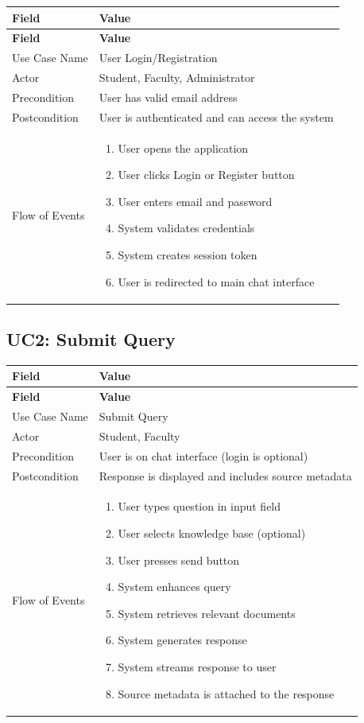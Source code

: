 \documentclass[12pt,a4paper]{book}
\numberwithin{table}{chapter}
\numberwithin{figure}{chapter}
\numberwithin{equation}{chapter}
\begin{document}
\begin{longtable}{|p{1.5in}|p{4in}|}
\hline
\textbf{Field} & \textbf{Value}\\
\hline
\endfirsthead
\hline
\textbf{Field} & \textbf{Value}\\
\hline
\endhead
\hline
Use Case Name & User Login/Registration\\
\hline
Actor & Student, Faculty, Administrator\\
\hline
Precondition & User has valid email address\\
\hline
Postcondition & User is authenticated and can access the system\\
\hline
Flow of Events &
\begin{enumerate}
    \item User opens the application
    \item User clicks Login or Register button
    \item User enters email and password
    \item System validates credentials
    \item System creates session token
    \item User is redirected to main chat interface
\end{enumerate}\\
\hline
\end{longtable}

\subsection{UC2: Submit Query}

\begin{longtable}{|p{1.5in}|p{4in}|}
\hline
\textbf{Field} & \textbf{Value}\\
\hline
\endfirsthead
\hline
\textbf{Field} & \textbf{Value}\\
\hline
\endhead
\hline
Use Case Name & Submit Query\\
\hline
Actor & Student, Faculty\\
\hline
Precondition & User is on chat interface (login is optional)\\
\hline
Postcondition & Response is displayed and includes source metadata\\
\hline
Flow of Events &
\begin{enumerate}
    \item User types question in input field
    \item User selects knowledge base (optional)
    \item User presses send button
    \item System enhances query
    \item System retrieves relevant documents
    \item System generates response
    \item System streams response to user
    \item Source metadata is attached to the response
\end{enumerate}\\
\hline
\end{longtable}
\end{document}
